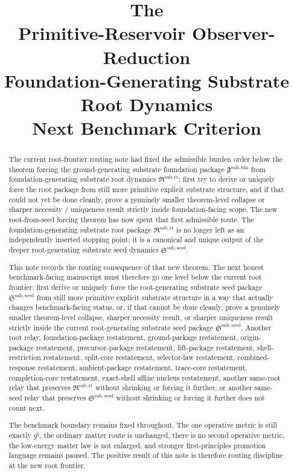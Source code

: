 \documentclass[11pt]{article}
\title{\textbf{The \TheoryName{}}\\[0.4em]
\large Primitive-Reservoir Observer-Reduction\\
\large Foundation-Generating Substrate Root Dynamics\\
\large Next Benchmark Criterion}
\author{}
\date{}
\newcommand{\CompletedMetric}{g^{\sharp}}
\newcommand{\FoundationPackage}{\mathfrak F^{\mathrm{sub,fdn}}}
\newcommand{\RootPackage}{\mathfrak R^{\mathrm{sub,rt}}}
\newcommand{\SeedPackage}{\mathfrak S^{\mathrm{sub,seed}}}
\begin{document}
\maketitle

\begin{abstract}
The current root-frontier routing note had fixed the admissible burden order below the theorem forcing the ground-generating substrate foundation package \(\FoundationPackage\) from foundation-generating substrate root dynamics \(\RootPackage\): first try to derive or uniquely force the root package from still more primitive explicit substrate structure, and if that could not yet be done cleanly, prove a genuinely smaller theorem-level collapse or sharper necessity / uniqueness result strictly inside foundation-facing scope. The new root-from-seed forcing theorem has now spent that first admissible route. The foundation-generating substrate root package \(\RootPackage\) is no longer left as an independently inserted stopping point; it is a canonical and unique output of the deeper root-generating substrate seed dynamics \(\SeedPackage\).

This note records the routing consequence of that new theorem. The next honest benchmark-facing manuscript must therefore go one level below the current root frontier: first derive or uniquely force the root-generating substrate seed package \(\SeedPackage\) from still more primitive explicit substrate structure in a way that actually changes benchmark-facing status, or, if that cannot be done cleanly, prove a genuinely smaller theorem-level collapse, sharper necessity result, or sharper uniqueness result strictly inside the current root-generating substrate seed package \(\SeedPackage\). Another root relay, foundation-package restatement, ground-package restatement, origin-package restatement, precursor-package restatement, lift-package restatement, shell-restriction restatement, split-core restatement, selector-law restatement, combined-response restatement, ambient-package restatement, trace-core restatement, completion-core restatement, exact-shell affine nucleus restatement, another same-root relay that preserves \(\RootPackage\) without shrinking or forcing it further, or another same-seed relay that preserves \(\SeedPackage\) without shrinking or forcing it further does not count next.

The benchmark boundary remains fixed throughout. The one operative metric is still exactly \(\CompletedMetric\), the ordinary matter route is unchanged, there is no second operative metric, the low-energy matter law is not enlarged, and stronger first-principles promotion language remains paused. The positive result of this note is therefore routing discipline at the new root frontier.
\end{abstract}
\end{document}
